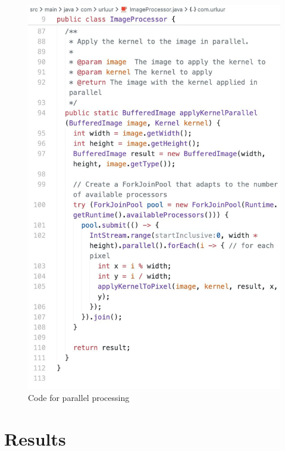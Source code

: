 \documentclass{article}
\begin{document}
\begin{multicols}{2}
    \begin{figure}[H]
        \centering
        \includegraphics[width=\linewidth]{img/parallel.jpg}
        \caption{Code for parallel processing}
        \label{fig:Parallel Code}
    \end{figure}







    \section{Results}


\end{multicols}
\end{document}
